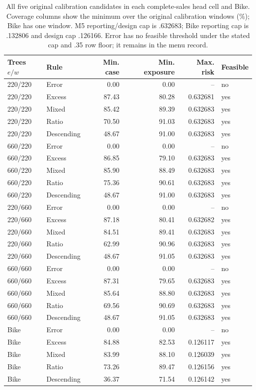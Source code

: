 \begin{table}[t]\centering\scriptsize
\caption{All five original calibration candidates in each complete-sales head cell and Bike. Coverage columns show the minimum over the original calibration windows (\%); Bike has one window. M5 reporting/design cap is .632683; Bike reporting cap is .132806 and design cap .126166. Error has no feasible threshold under the stated cap and .35 row floor; it remains in the menu record.}\label{tab:v7-calibration}
\begin{tabular}{llrrrl}\toprule
Trees $e/w$ & Rule & Min. case & Min. exposure & Max. risk & Feasible\\\midrule
220/220 & Error & 0.00 & 0.00 & -- & no \\
220/220 & Excess & 87.43 & 80.28 & 0.632681 & yes \\
220/220 & Mixed & 85.42 & 89.39 & 0.632683 & yes \\
220/220 & Ratio & 70.50 & 91.03 & 0.632683 & yes \\
220/220 & Descending & 48.67 & 91.00 & 0.632683 & yes \\
660/220 & Error & 0.00 & 0.00 & -- & no \\
660/220 & Excess & 86.85 & 79.10 & 0.632683 & yes \\
660/220 & Mixed & 85.90 & 88.49 & 0.632683 & yes \\
660/220 & Ratio & 75.36 & 90.61 & 0.632683 & yes \\
660/220 & Descending & 48.67 & 91.00 & 0.632683 & yes \\
220/660 & Error & 0.00 & 0.00 & -- & no \\
220/660 & Excess & 87.18 & 80.41 & 0.632682 & yes \\
220/660 & Mixed & 84.51 & 89.41 & 0.632683 & yes \\
220/660 & Ratio & 62.99 & 90.96 & 0.632683 & yes \\
220/660 & Descending & 48.67 & 91.05 & 0.632683 & yes \\
660/660 & Error & 0.00 & 0.00 & -- & no \\
660/660 & Excess & 87.31 & 79.65 & 0.632683 & yes \\
660/660 & Mixed & 85.64 & 88.80 & 0.632683 & yes \\
660/660 & Ratio & 69.56 & 90.69 & 0.632683 & yes \\
660/660 & Descending & 48.67 & 91.05 & 0.632683 & yes \\
Bike & Error & 0.00 & 0.00 & -- & no \\
Bike & Excess & 84.88 & 82.53 & 0.126117 & yes \\
Bike & Mixed & 83.99 & 88.10 & 0.126039 & yes \\
Bike & Ratio & 73.26 & 89.47 & 0.126156 & yes \\
Bike & Descending & 36.37 & 71.54 & 0.126142 & yes \\
\bottomrule\end{tabular}\end{table}
